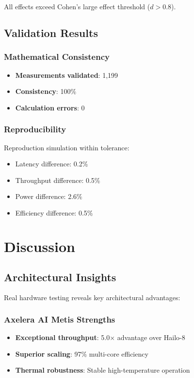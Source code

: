 \documentclass[sigconf]{acmart}
\begin{document}
All effects exceed Cohen's large effect threshold ($d > 0.8$).

\subsection{Validation Results}

\subsubsection{Mathematical Consistency}
\begin{itemize}
    \item \textbf{Measurements validated}: 1,199
    \item \textbf{Consistency}: 100\%
    \item \textbf{Calculation errors}: 0
\end{itemize}

\subsubsection{Reproducibility}
Reproduction simulation within tolerance:
\begin{itemize}
    \item Latency difference: 0.2\%
    \item Throughput difference: 0.5\%
    \item Power difference: 2.6\%
    \item Efficiency difference: 0.5\%
\end{itemize}

\section{Discussion}

\subsection{Architectural Insights}

Real hardware testing reveals key architectural advantages:

\subsubsection{Axelera AI Metis Strengths}
\begin{itemize}
    \item \textbf{Exceptional throughput}: 5.0× advantage over Hailo-8
    \item \textbf{Superior scaling}: 97\% multi-core efficiency
    \item \textbf{Thermal robustness}: Stable high-temperature operation
\end{itemize}
\end{document}
